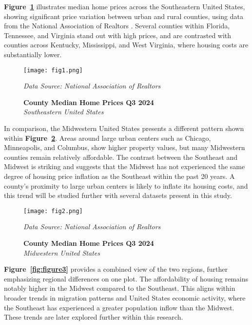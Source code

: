 \documentclass[journal,article,submit,pdftex,moreauthors]{Definitions/mdpi}
\begin{document}
\textbf{Figure~\ref{fig:figure1}} illustrates median home prices across the Southeastern United States, showing significant price variation between urban and rural counties, using data from the National Association of Realtors \citep{_2024_county}. Several counties within Florida, Tennessee, and Virginia stand out with high prices, and are contrasted with counties across Kentucky, Mississippi, and West Virginia, where housing costs are substantially lower.

\begin{figure}[H]
  \centering
  \texttt{[image: fig1.png]}
  \caption{\textbf{County Median Home Prices Q3 2024}\\\textit{Southeastern United States}}
  \label{fig:figure1}
  \vspace{1ex}
  {\footnotesize\textit{Data Source: National Association of Realtors}}
\end{figure}
        	
In comparison, the Midwestern United States presents a different pattern shown within \textbf{Figure~\ref{fig:figure2}}. Areas around large urban centers such as Chicago, Minneapolis, and Columbus, show higher property values, but many Midwestern counties remain relatively affordable. The contrast between the Southeast and Midwest is striking and suggests that the Midwest has not experienced the same degree of housing price inflation as the Southeast within the past 20 years. A county’s proximity to large urban centers is likely to inflate its housing costs, and this trend will be studied further with several datasets present in this study.  

\begin{figure}[H]
  \centering
  \texttt{[image: fig2.png]}
  \caption{\textbf{County Median Home Prices Q3 2024}\\\textit{Midwestern United States}}
  \label{fig:figure2}
  \vspace{1ex}
  {\footnotesize\textit{Data Source: National Association of Realtors}}
\end{figure}

\textbf{Figure~\ref{fig:figure3}} provides a combined view of the two regions, further emphasizing regional differences on one plot. The affordability of housing remains notably higher in the Midwest compared to the Southeast. This aligns within broader trends in migration patterns and United States economic activity, where the Southeast has experienced a greater population inflow than the Midwest. These trends are later explored further within this research.
\end{document}

